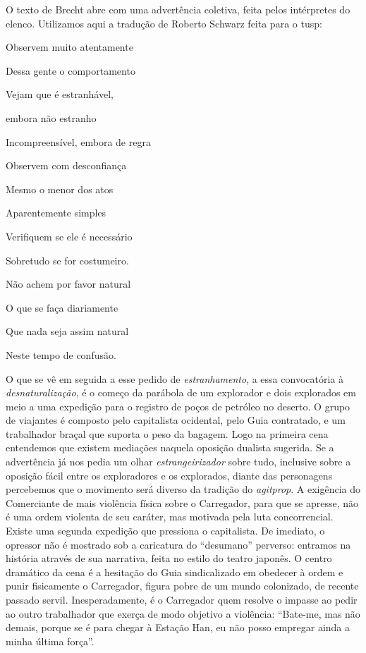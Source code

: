 O texto de Brecht abre com uma advertência coletiva, feita pelos
intérpretes do elenco. Utilizamos aqui a tradução de Roberto Schwarz
feita para o {\sc tusp}:

\startblockquote
Observem muito atentamente

Dessa gente o comportamento

Vejam que é estranhável,

embora não estranho

Incompreensível, embora de regra

Observem com desconfiança

Mesmo o menor dos atos

Aparentemente simples

Verifiquem se ele é necessário

Sobretudo se for costumeiro.

Não achem por favor natural

O que se faça diariamente

Que nada seja assim natural

Neste tempo de confusão.
\stopblockquote

O que se vê em seguida a esse pedido de {\it estranhamento}, a essa
convocatória à {\it desnaturalização}, é o começo da parábola de um
explorador e dois explorados em meio a uma expedição para o registro de
poços de petróleo no deserto. O grupo de viajantes é composto pelo
capitalista ocidental, pelo Guia contratado, e um trabalhador braçal que
suporta o peso da bagagem. Logo na primeira cena entendemos que existem
mediações naquela oposição dualista sugerida. Se a advertência já nos
pedia um olhar {\it estrangeirizador} sobre tudo, inclusive sobre a oposição
fácil entre os exploradores e os explorados, diante das personagens
percebemos que o movimento será diverso da tradição do {\it agitprop}. A
exigência do Comerciante de mais violência física sobre o Carregador,
para que se apresse, não é uma ordem violenta de seu caráter, mas
motivada pela luta concorrencial. Existe uma segunda expedição que
pressiona o capitalista. De imediato, o opressor não é mostrado sob a
caricatura do “desumano” perverso: entramos na história através de sua
narrativa, feita no estilo do teatro japonês. O centro dramático da cena
é a hesitação do Guia sindicalizado em obedecer à ordem e punir
fisicamente o Carregador, figura pobre de um mundo colonizado, de
recente passado servil. Inesperadamente, é o Carregador quem resolve o
impasse ao pedir ao outro trabalhador que exerça de modo objetivo a
violência: “Bate-me, mas não demais, porque se é para chegar à Estação
Han, eu não posso empregar ainda a minha última força”.

